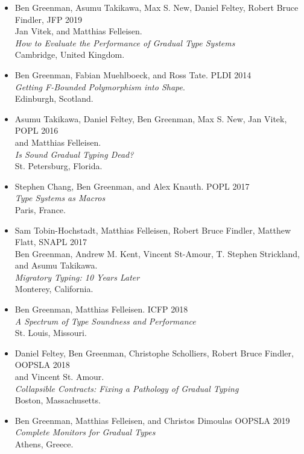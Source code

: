 \documentclass{article}
\begin{document}

\begin{itemize}
\item
  Ben Greenman, Asumu Takikawa, Max S. New, Daniel Feltey, Robert Bruce Findler, \hfill JFP 2019 \\
  Jan Vitek, and Matthias Felleisen. \\
  \emph{How to Evaluate the Performance of Gradual Type Systems} \\
  Cambridge, United Kingdom.
\end{itemize}

\begin{itemize}
\item
  Ben Greenman, Fabian Muehlboeck, and Ross Tate. \hfill PLDI 2014 \\
  \emph{Getting F-Bounded Polymorphism into Shape}. \\
  Edinburgh, Scotland.
\item
  Asumu Takikawa, Daniel Feltey, Ben Greenman, Max S. New, Jan Vitek, \hfill POPL 2016 \\
   and Matthias Felleisen. \\
   \emph{Is Sound Gradual Typing Dead?} \\
  St. Petersburg, Florida.
\item
  Stephen Chang, Ben Greenman, and Alex Knauth. \hfill POPL 2017 \\
   \emph{Type Systems as Macros} \\
  Paris, France.
\item
  Sam Tobin-Hochstadt, Matthias Felleisen, Robert Bruce Findler, Matthew Flatt, \hfill SNAPL 2017 \\
  Ben Greenman, Andrew M. Kent, Vincent St-Amour, T. Stephen Strickland, \\
  and Asumu Takikawa. \\
  \emph{Migratory Typing: 10 Years Later} \\
  Monterey, California.
\item
  Ben Greenman, Matthias Felleisen. \hfill ICFP 2018 \\
  \emph{A Spectrum of Type Soundness and Performance} \\
  St. Louis, Missouri.
\item
  Daniel Feltey, Ben Greenman, Christophe Scholliers, Robert Bruce Findler, \hfill OOPSLA 2018 \\
  and Vincent St. Amour. \\
  \emph{Collapsible Contracts: Fixing a Pathology of Gradual Typing} \\
  Boston, Massachusetts.
\item
  Ben Greenman, Matthias Felleisen, and Christos Dimoulas \hfill OOPSLA 2019 \\
  \emph{Complete Monitors for Gradual Types} \\
  Athens, Greece.
\end{itemize}
\end{document}
